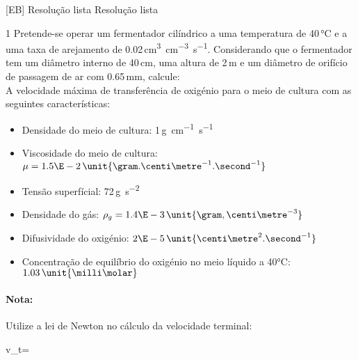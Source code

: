 \documentclass[\mainfilename]{subfiles}
\begin{document}

[EB]
{Resolução lista} %
{Resolução lista} %

\begin{questionBox}1{} %
    Pretende-se operar um fermentador cilíndrico a uma temperatura de 40\,\unit{\celsius} e a uma taxa de arejamento de 0.02\,\unit{\centi\metre^3.\centi\metre^{-3}.\second^{-1}}. Considerando que o fermentador tem um diâmetro interno de 40\,\unit{\centi\metre}, uma altura de 2\,\unit{\metre} e um diâmetro de orifício de passagem de ar com 0.65\,\unit{\milli\metre}, calcule:\\
    A velocidade máxima de transferência de oxigénio para o meio de cultura com as seguintes características:
    \begin{itemize}
        \item Densidade do meio de cultura: 1\,\unit{\gram.\centi\metre^{-1}.\second^{-1}}
        \item Viscosidade do meio de cultura: \(\mu=1.5\E-2\,\unit{\gram.\centi\metre^{-1}.\second^{-1}}\)
        \item Tensão superfícial: 72\,\unit{\gram.\second^{-2}}
        \item Densidade do gás: \(\rho_g=1.4\E-3\,\unit{\gram,\centi\metre^{-3}}\)
        \item Difusividade do oxigénio: \(2\E-5\,\unit{\centi\metre^2.\second^{-1}}\)
        \item Concentração de equilíbrio do oxigénio no meio líquido a 40\unit{\celsius}: \(1.03\,\unit{\milli\molar}\)
    \end{itemize}
    \paragraph*{Nota:}Utilize a lei de Newton no cálculo da velocidade terminal:
    \begin{BM}
        v_t=
    \end{BM}
\end{questionBox}
\end{document}
